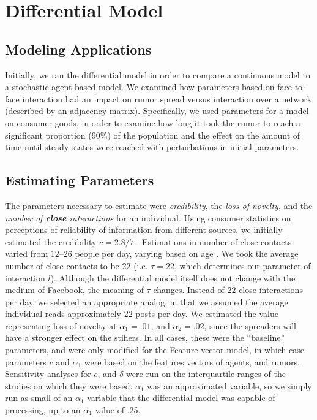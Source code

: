 \section{Differential Model }
\label{sec:diffmodel}

\subsection{Modeling Applications}
\label{subsec:diffmodeapp}

Initially, we ran the differential model in order to compare a continuous model to a stochastic agent-based model. We examined how parameters based on face-to-face interaction had an impact on rumor spread versus interaction over a network (described by an adjacency matrix). Specifically, we used parameters for a model on consumer goods, in order to examine how long it took the rumor to reach a significant proportion (90\%) of the population and the effect on the amount of time until steady states were reached with perturbations in initial parameters.

\subsection{Estimating Parameters}
\label{subsec:diffmodeeparam}

The parameters necessary to estimate were \textit{credibility}, the
\textit{loss of novelty}, and the \textit{number of \textbf{close} interactions} for an individual. Using consumer statistics on perceptions of reliability of information from different sources, we initially estimated the credibility $ c = 2.8/7 $ \cite{kamins-1997}. Estimations in number of close contacts varied from $ 12 $--$ 26 $ people per day, varying based on age \cite{cahill-1996, mossong-2008, edmunds-2006}. We took the average number of close contacts to be $ 22 $ (i.e. $ \tau = 22 $, which determines our parameter of interaction $ l $). Although the differential model itself does not change with the medium of Facebook, the meaning of $ \tau $ changes. Instead of $ 22 $ close interactions per day, we selected an appropriate analog, in that we assumed the average individual reads approximately $ 22 $ posts per day. We estimated the value representing loss of novelty at $ \alpha_1 = .01 $, and  $ \alpha_2 = .02 $, since the spreaders will have a stronger effect on the stiflers.
In all cases, these were the ``baseline'' parameters, and were only modified for the Feature vector model, in which case parameters $ c $ and $ \alpha_1 $  were based on the features vectors of agents, and rumors. Sensitivity analyses for $ c $, and $ \delta $ were run on the interquartile ranges of the studies on which they were based. $ \alpha_1 $ was an approximated variable, so we simply run as small of an $ \alpha_1 $ variable that the differential model was capable of processing, up to an $ \alpha_1 $ value of .25.
